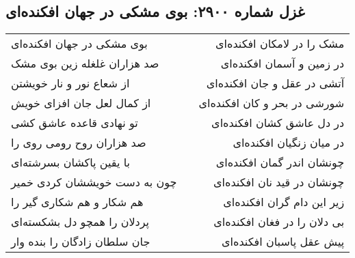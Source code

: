 \begin{center}
\section*{غزل شماره ۲۹۰۰: بوی مشکی در جهان افکنده‌ای}
\label{sec:2900}
\begin{longtable}{l p{0.5cm} r}
بوی مشکی در جهان افکنده‌ای
&&
مشک را در لامکان افکنده‌ای
\\
صد هزاران غلغله زین بوی مشک
&&
در زمین و آسمان افکنده‌ای
\\
از شعاع نور و نار خویشتن
&&
آتشی در عقل و جان افکنده‌ای
\\
از کمال لعل جان افزای خویش
&&
شورشی در بحر و کان افکنده‌ای
\\
تو نهادی قاعده عاشق کشی
&&
در دل عاشق کشان افکنده‌ای
\\
صد هزاران روح رومی روی را
&&
در میان زنگیان افکنده‌ای
\\
با یقین پاکشان بسرشته‌ای
&&
چونشان اندر گمان افکنده‌ای
\\
چون به دست خویششان کردی خمیر
&&
چونشان در قید نان افکنده‌ای
\\
هم شکار و هم شکاری گیر را
&&
زیر این دام گران افکنده‌ای
\\
پردلان را همچو دل بشکسته‌ای
&&
بی دلان را در فغان افکنده‌ای
\\
جان سلطان زادگان را بنده وار
&&
پیش عقل پاسبان افکنده‌ای
\\
\end{longtable}
\end{center}
